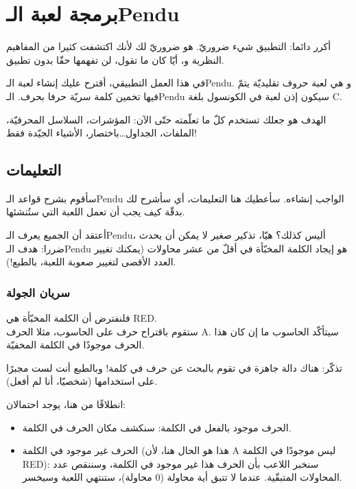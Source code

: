 \chapter{برمجة لعبة الـ\textenglish{Pendu}}

أكرر دائما: التطبيق شيء ضروريّ. هو ضروريّ لك لأنك اكتشفت كثيرا من المفاهيم النظرية و، أيّا كان ما تقول، لن تفهمها حقّا بدون تطبيق.

في هذا العمل التطبيقي، أقترح عليك إنشاء لعبة الـ\textenglish{Pendu}.
و هي لعبة حروف تقليديّة يتمّ فيها تخمين كلمة سريّة حرفا بحرف. الـ\textenglish{Pendu}
سيكون إذن لعبة في الكونسول بلغة
\textenglish{C}.

الهدف هو جعلك تستخدم كلّ ما تعلّمته حتّى الآن: المؤشرات، السلاسل المحرفيّة، الملفات، الجداول\dots باختصار، الأشياء الجيّدة فقط!

\section{التعليمات}

سأقوم بشرح قواعد الـ\textenglish{Pendu}
الواجب إنشاءه. سأعطيك هنا التعليمات، أي سأشرح لك بدقّة كيف يجب أن تعمل اللعبة التي ستُنشئها.

أعتقد أن الجميع يعرف
الـ\textenglish{Pendu}،
أليس كذلك؟ هيّا، تذكير صغير لا يمكن أن يحدث ضررا: هدف الـ\textenglish{Pendu}
هو إيجاد الكلمة المخبّأة في أقلّ من عشر محاولات (يمكنك تغيير العدد الأقصى لتغيير صعوبة اللعبة، بالطبع!).

\subsection{سريان الجولة}
فلنفترض أن الكلمة المخبّأة هي \textenglish{RED}.\\
ستقوم باقتراح حرف على الحاسوب، مثلا الحرف
\textenglish{A}.
سيتأكّد الحاسوب ما إن كان هذا الحرف موجودًا في الكلمة المخفيّة.

\begin{information}
تذكّر: هناك دالة جاهزة في
تقوم بالبحث عن حرف في كلمة! وبالطبع أنت لست مجبرًا على استخدامها (شخصيّا، أنا لم أفعل).
\end{information}

انطلاقًا من هنا، يوجد احتمالان:

\begin{itemize}
  \item الحرف موجود بالفعل في الكلمة: سنكشف مكان الحرف في الكلمة.
  \item الحرف غير موجود في الكلمة (هذا هو الحال هنا، لأن
\textenglish{A}
ليس موجودًا في الكلمة
\textenglish{RED}):
سنخبر اللاعب بأن الحرف هذا غير موجود في الكلمة، وسننقص عدد المحاولات المتبقّية. عندما لا تتبق أية محاولة (0 محاولة)، ستنتهي اللعبة وسيخسر.
\end{itemize}

